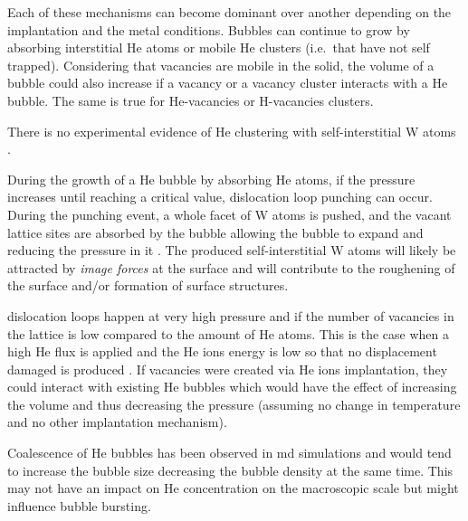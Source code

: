 Each of these mechanisms can become dominant over another depending on the implantation and the metal conditions. 
Bubbles can continue to grow by absorbing interstitial \gls{He} atoms or mobile \gls{He} clusters (i.e.\ that have not self trapped).
Considering that vacancies are mobile in the solid, the volume of a bubble could also increase if a \gls{vacancy} or a \gls{vacancy} cluster interacts with a \gls{He} bubble.
The same is true for He-vacancies or H-vacancies clusters.

There is no experimental evidence of \gls{He} clustering with \gls{self-interstitial} \gls{W} atoms .

During the growth of a \gls{He} bubble by absorbing \gls{He} atoms, if the pressure increases until reaching a critical value, \gls{dislocation loop} punching can occur.
During the punching event, a whole facet of \gls{W} atoms is pushed, and the vacant \gls{lattice} sites are absorbed by the bubble allowing the bubble to expand and reducing the pressure in it .
The produced \gls{self-interstitial} \gls{W} atoms will likely be attracted by \textit{image forces} at the surface and will contribute to the roughening of the surface and/or formation of surface structures.

\Glspl{dislocation loop} happen at very high pressure and if the number of vacancies in the \gls{lattice} is low compared to the amount of \gls{He} atoms.
This is the case when a high \gls{He} flux is applied and the \gls{He} ions energy is low so that no displacement damaged is produced \cite{sefta_surface_2013}.
If vacancies were created via \gls{He} ions implantation, they could interact with existing \gls{He} bubbles which would have the effect of increasing the volume and thus decreasing the pressure (assuming no change in temperature and no other implantation mechanism).

Coalescence of \gls{He} bubbles has been observed in \gls{md} simulations  and would tend to increase the bubble size decreasing the bubble density at the same time.
This may not have an impact on \gls{He} concentration on the macroscopic scale but might influence bubble bursting.


